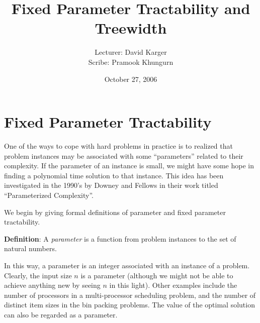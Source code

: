 \documentclass{article}
\title{Fixed Parameter Tractability and Treewidth}
\date{October 27, 2006}
\author{Lecturer: David Karger\\ Scribe: Pramook Khungurn}
\begin{document}
%
%
%
%

%



\section{Fixed Parameter Tractability}

One of the ways to cope with hard problems in practice is to realized that problem instances may be associated with 
some ``parameters'' related to their complexity. If the parameter of an instance is small, we might have some hope 
in finding a polynomial time  solution to that instance. This idea has been investigated in the 1990's by 
Downey and Fellows in their work titled ``Parameterized Complexity''.

We begin by giving formal definitions of parameter and fixed parameter tractability.

\textbf{Definition}:
A \emph{parameter} is a function from problem instances to the set of natural numbers.

In this way, a parameter is an integer associated with an instance of a problem. 
Clearly, the input size $n$ is a parameter (although we might not be able to achieve anything new
by seeing $n$ in this light). Other examples include the number of processors in a
multi-processor scheduling problem, and the number of distinct item sizes in the bin packing problems.
The value of the optimal solution can also be regarded as a parameter.
\end{document}
